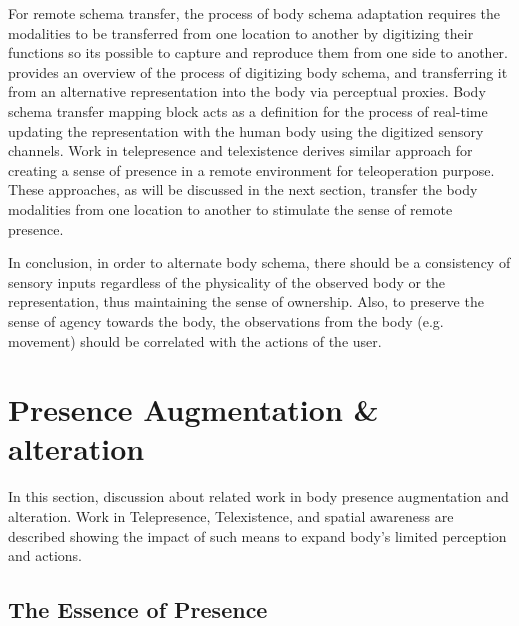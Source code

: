 For remote schema transfer, the process of body schema adaptation requires the modalities to be transferred from one location to another by digitizing their functions so its possible to capture and reproduce them from one side to another.  provides an overview of the process of digitizing body schema, and transferring it from an alternative representation into the body via perceptual proxies. Body schema transfer mapping block acts as a definition for the process of real-time updating the representation with the human body using the digitized sensory channels. Work in telepresence and telexistence derives similar approach for creating a sense of presence in a remote environment for teleoperation purpose. These approaches, as will be discussed in the next section, transfer the body modalities from one location to another to stimulate the sense of remote presence.



In conclusion, in order to alternate body schema, there should be a consistency of sensory inputs regardless of the physicality of the observed body or the representation, thus maintaining the sense of ownership. Also, to preserve the sense of agency towards the body, the observations from the body (e.g. movement) should be correlated with the actions of the user. 


\section{Presence Augmentation \& alteration}

In this section, discussion about related work in body presence augmentation and alteration. Work in Telepresence, Telexistence, and spatial awareness are described showing the impact of such means to expand body's limited perception and actions. 

\subsection{The Essence of Presence}

